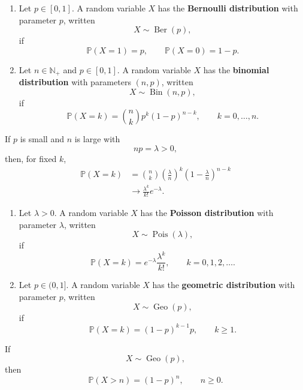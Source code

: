 \begin{definitionenv}
\begin{enumerate}
    \item Let $p\in[0,1]$. A random variable $X$ has the
\textbf{Bernoulli distribution} with parameter $p$, written
\[
    X\sim\operatorname{Ber}(p),
\]
if
\[
    \mathbb{P}(X=1)=p,
    \qquad
    \mathbb{P}(X=0)=1-p.
\]

\item Let $n\in\mathbb{N}_+$ and $p\in[0,1]$. A random variable $X$ has the
\textbf{binomial distribution} with parameters $(n,p)$, written
\[
    X\sim\operatorname{Bin}(n,p),
\]
if
\[
    \mathbb{P}(X=k)
    =
    \binom{n}{k}p^k(1-p)^{n-k},
    \qquad
    k=0,\ldots,n.
\]
\end{enumerate}
\end{definitionenv}

\begin{remark}
If $p$ is small and $n$ is large with
\[
    np=\lambda>0,
\]
then, for fixed $k$,
\[
\begin{aligned}
    \mathbb{P}(X=k)
    &=
    \binom{n}{k}
    \left(\frac{\lambda}{n}\right)^k
    \left(1-\frac{\lambda}{n}\right)^{n-k} \\
    &\longrightarrow
    \frac{\lambda^k}{k!}e^{-\lambda}.
\end{aligned}
\]
\end{remark}

\begin{definitionenv}
\begin{enumerate}
    \item Let $\lambda>0$. A random variable $X$ has the
\textbf{Poisson distribution} with parameter $\lambda$, written
\[
    X\sim\operatorname{Pois}(\lambda),
\]
if
\[
    \mathbb{P}(X=k)
    =
    e^{-\lambda}\frac{\lambda^k}{k!},
    \qquad
    k=0,1,2,\ldots.
\]

\item Let $p\in(0,1]$. A random variable $X$ has the
\textbf{geometric distribution} with parameter $p$, written
\[
    X\sim\operatorname{Geo}(p),
\]
if
\[
    \mathbb{P}(X=k)
    =
    (1-p)^{k-1}p,
    \qquad
    k\ge1.
\]
\end{enumerate}
\end{definitionenv}

\begin{propositionenv}
If
\[
    X\sim\operatorname{Geo}(p),
\]
then
\[
    \mathbb{P}(X>n)=(1-p)^n,
    \qquad
    n\ge0.
\]
\end{propositionenv}


